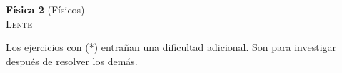 \documentclass[11pt,spanish,a4paper]{article}
\begin{document}
\begin{center}
	\textbf{Física 2} (Físicos) \hfill {}\\
	\textsc{\LARGE Lente}
\end{center}

Los ejercicios con (*) entrañan una dificultad adicional. Son para investigar después de resolver los demás.


\begin{enumerate}












\end{enumerate}
\end{document}
